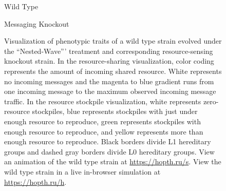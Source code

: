 \begin{figure}[!htbp]
\begin{center}
\vspace{1.0ex}

\hspace*{\fill}%
\begin{minipage}[t]{0.05\columnwidth}
\vspace{0pt} %
\end{minipage}%
\hfill
\begin{minipage}[t]{0.45\columnwidth}
\centering
\vspace{0pt} %
Wild Type
\end{minipage}%
\hfill
\begin{minipage}[t]{0.45\columnwidth}
\centering
\vspace{0pt} %
Messaging Knockout
\end{minipage}%
\hspace*{\fill}

\vspace{1.0ex}

\caption{
Visualization of phenotypic traits of a wild type strain evolved under the ``Nested-Wave''' treatment and corresponding resource-sensing knockout strain.
In the resource-sharing visualization, color coding represents the amount of incoming shared resource.
White represents no incoming messages and the magenta to blue gradient runs from one incoming message to the maximum observed incoming message traffic.
In the resource stockpile visualization, white represents zero-resource stockpiles, blue represents stockpiles with just under enough resource to reproduce, green represents stockpiles with enough resource to reproduce, and yellow represents more than enough resource to reproduce.
Black borders divide L1 hereditary groups and dashed gray borders divide L0 hereditary groups.
View an animation of the wild type strain at \url{https://hopth.ru/s}.
View the wild type strain in a live in-browser simulation at \url{https://hopth.ru/h}.
}
\label{fig:ko-stockpiletrigger-sharing}
\end{center}
\end{figure}

